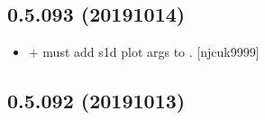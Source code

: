 \documentclass[a4paper,10pt,english]{report}
\begin{document}
\subsection{0.5.093 (2019\sphinxhyphen{}10\sphinxhyphen{}14)}
\label{\detokenize{misc/changelog:id68}}\begin{itemize}
\item {} 
 +
 \sphinxhyphen{} must add s1d plot args to
. {[}njcuk9999{]}

\end{itemize}


\subsection{0.5.092 (2019\sphinxhyphen{}10\sphinxhyphen{}13)}
\end{document}
